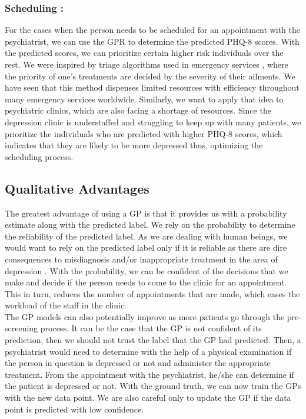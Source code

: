 \documentclass{article}
\begin{document}
    \subsubsection{Scheduling :}
    For the cases when the person needs to be scheduled for an appointment with the psychiatrist, we can use the GPR to determine the predicted PHQ-8 scores. 
    With the predicted scores, we can prioritize certain higher risk individuals over the rest. 
    We were inspired by triage algorithms used in emergency services \cite{shah2015managing,oredsson2011systematic}, where the priority of one's treatments are decided by the severity of their ailments.
    We have seen that this method dispenses limited resources with efficiency \cite{rosedale2011effectiveness} throughout many emergency services worldwide. 
    Similarly, we want to apply that idea to psychiatric clinics, which are also facing a shortage of resources. 
    Since the depression clinic is understaffed and struggling to keep up with many patients, we prioritize the individuals who are predicted with higher PHQ-8 scores, which indicates that they are likely to be more depressed thus, optimizing the scheduling process.
    
    \subsection{Qualitative Advantages}
The greatest advantage of using a GP is that it provides us with a probability estimate along with the predicted label. 
    We rely on the probability to determine the reliability of the predicted label. 
    As we are dealing with human beings, we would want to rely on the predicted label only if it is reliable as there are dire consequences to misdiagnosis and/or inappropriate treatment in the area of depression \cite{nasrallah2015consequences,bowden2001strategies,dunner2003clinical}. 
    With the probability, we can be confident of the decisions that we make and decide if the person needs to come to the clinic for an appointment. 
    This in turn, reduces the number of appointments that are made, which eases the workload of the staff in the clinic. \\
    
    The GP models can also potentially improve as more patients go through the pre-screening process.
    It can be the case that the GP is not confident of its prediction, then we should not trust the label that the GP had predicted. 
    Then, a psychiatrist would need to determine with the help of a physical examination if the person in question is depressed or not and administer the appropriate treatment. 
    From the appointment with the psychiatrist, he/she can determine if the patient is depressed or not. 
    With the ground truth, we can now train the GPs with the new data point. 
    We are also careful only to update the GP if the data point is predicted with low confidence. \\
\end{document}
